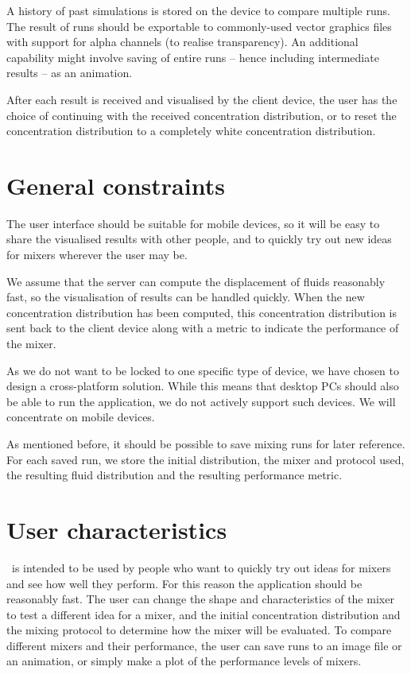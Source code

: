 A history of past simulations is stored on the device to compare multiple runs. The result of runs should be exportable to commonly-used vector graphics files with support for alpha channels (to realise transparency). An additional capability might involve saving of entire runs -- hence including intermediate results -- as an animation.

After each result is received and visualised by the client device, the user has the choice of continuing with the received concentration distribution, or to reset the concentration distribution to a completely white concentration distribution. 

\section{General constraints}
The user interface should be suitable for mobile devices, so it will be easy to share the visualised results with other people, and to quickly try out new ideas for mixers wherever the user may be.

We assume that the server can compute the displacement of fluids reasonably fast, so the visualisation of results can be handled quickly. When the new concentration distribution has been computed, this concentration distribution is sent back to the client device along with a metric to indicate the performance of the mixer.

As we do not want to be locked to one specific type of device, we have chosen to design a cross-platform solution. While this means that desktop PCs should also be able to run the application, we do not actively support such devices. We will concentrate on mobile devices.

As mentioned before, it should be possible to save mixing runs for later reference. For each saved run, we store the initial distribution, the mixer and protocol used, the resulting fluid distribution and the resulting performance metric.

\section{User characteristics}
\projectname\ is intended to be used by people who want to quickly try out ideas for mixers and see how well they perform. For this reason the application should be reasonably fast. The user can change the shape and characteristics of the mixer to test a different idea for a mixer, and the initial concentration distribution and the mixing protocol to determine how the mixer will be evaluated. To compare different mixers and their performance, the user can save runs to an image file or an animation, or simply make a plot of the performance levels of mixers.

